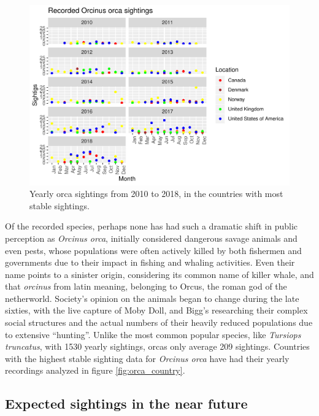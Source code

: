 \documentclass[10pt,letterpaper]{article}
\begin{document}
\begin{figure}
\includegraphics[width=1\linewidth]{SubjectEvaluation_3R_article_files/figure-latex/unnamed-chunk-6-1} \caption{\label{fig:orca_country} Yearly orca sightings from 2010 to 2018, in the countries with most stable sightings.}\label{fig:unnamed-chunk-6}
\end{figure}

Of the recorded species, perhaps none has had such a dramatic shift in
public perception as \emph{Orcinus orca}, initially considered dangerous
savage animals and even pests, whose populations were often actively
killed by both fishermen and governments due to their impact in fishing
and whaling activities. Even their name points to a sinister origin,
considering its common name of killer whale, and that \emph{orcinus}
from latin meaning, belonging to Orcus, the roman god of the
netherworld. Society's opinion on the animals began to change during the
late sixties, with the live capture of Moby Doll, and Bigg's researching
their complex social structures and the actual numbers of their heavily
reduced populations due to extensive ``hunting''. Unlike the most common
popular species, like \emph{Tursiops truncatus}, with 1530 yearly
sightings, orcas only average 209 sightings. Countries with the highest
stable sighting data for \emph{Orcinus orca} have had their yearly
recordings analyzed in figure \ref{fig:orca_country}.

\hypertarget{expected-sightings-in-the-near-future}{%
\subsection{Expected sightings in the near
future}\label{expected-sightings-in-the-near-future}}
\end{document}
